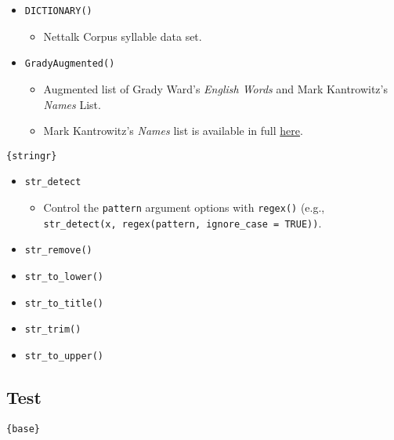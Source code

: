 \documentclass[
]{book}
\providecommand{\tightlist}{%
  \setlength{\itemsep}{0pt}\setlength{\parskip}{0pt}}
\begin{document}
\begin{itemize}
\tightlist
\item
  \texttt{DICTIONARY()}

  \begin{itemize}
  \tightlist
  \item
    Nettalk Corpus syllable data set.
  \end{itemize}
\item
  \texttt{GradyAugmented()}

  \begin{itemize}
  \tightlist
  \item
    Augmented list of Grady Ward's \emph{English Words} and Mark Kantrowitz's \emph{Names} List.
  \item
    Mark Kantrowitz's \emph{Names} list is available in full \href{http://www.cs.cmu.edu/afs/cs/project/ai-repository/ai/areas/nlp/corpora/names/}{here}.
  \end{itemize}
\end{itemize}

\texttt{\{stringr\}}

\begin{itemize}
\tightlist
\item
  \texttt{str\_detect}

  \begin{itemize}
  \tightlist
  \item
    Control the \texttt{pattern} argument options with \texttt{regex()} (e.g., \texttt{str\_detect(x,\ regex(pattern,\ ignore\_case\ =\ TRUE))}.
  \end{itemize}
\item
  \texttt{str\_remove()}
\item
  \texttt{str\_to\_lower()}
\item
  \texttt{str\_to\_title()}
\item
  \texttt{str\_trim()}
\item
  \texttt{str\_to\_upper()}
\end{itemize}

\hypertarget{test}{%
\subsection{Test}\label{test}}

\texttt{\{base\}}
\end{document}
